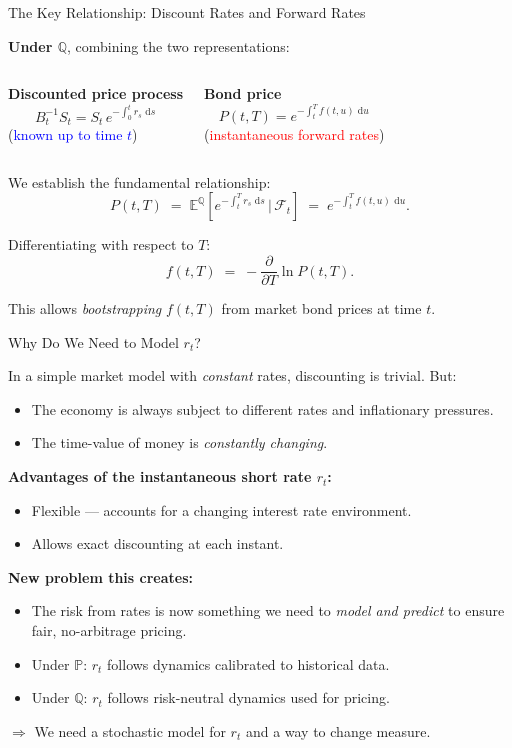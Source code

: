 \documentclass[compress]{beamer}
\newcommand{\PP}{\mathbb{P}}
\newcommand{\QQ}{\mathbb{Q}}
\newcommand{\EE}{\mathbb{E}}
\newcommand{\FF}{\mathcal{F}}
\newcommand{\dd}{\,\mathrm{d}}
\begin{document}
\begin{frame}{The Key Relationship: Discount Rates and Forward Rates}

\textbf{Under $\QQ$}, combining the two representations:

\medskip
\begin{columns}
\textbf{Discounted price process}
\[
	B_t^{-1} S_t = S_t\,e^{-\int_0^t r_s\,\dd s}
\]
(\textcolor{blue}{known up to time $t$})

\textbf{Bond price}
\[
	P(t,T) = e^{-\int_t^T f(t,u)\,\dd u}
\]
(\textcolor{red}{instantaneous forward rates})
\end{columns}

\medskip\medskip
We establish the fundamental relationship:
\[
	P(t,T)
	\;=\; \EE^{\QQ}\!\!\left[e^{-\int_t^T r_s\,\dd s}\,\Big|\,\FF_t\right]
	\;=\; e^{-\int_t^T f(t,u)\,\dd u}.
\]

\medskip
Differentiating with respect to $T$:
\[
	f(t,T) \;=\; -\frac{\partial}{\partial T}\ln P(t,T).
\]

This allows \textit{bootstrapping} $f(t,T)$ from market bond prices at time $t$.

\end{frame}

\begin{frame}{Why Do We Need to Model $r_t$?}

In a simple market model with \textit{constant} rates, discounting is trivial. But:

\medskip
\begin{itemize}
	\item The economy is always subject to different rates and inflationary pressures.
	\item The time-value of money is \textit{constantly changing}.
\end{itemize}

\medskip
\textbf{Advantages of the instantaneous short rate $r_t$:}
\begin{itemize}
	\item Flexible — accounts for a changing interest rate environment.
	\item Allows exact discounting at each instant.
\end{itemize}

\medskip
\textbf{New problem this creates:}
\begin{itemize}
	\item The risk from rates is now something we need to \textit{model and predict} to ensure fair, no-arbitrage pricing.
	\item Under $\PP$: $r_t$ follows dynamics calibrated to historical data.
	\item Under $\QQ$: $r_t$ follows risk-neutral dynamics used for pricing.
\end{itemize}

$\Rightarrow$ We need a stochastic model for $r_t$ and a way to change measure.

\end{frame}
\end{document}
